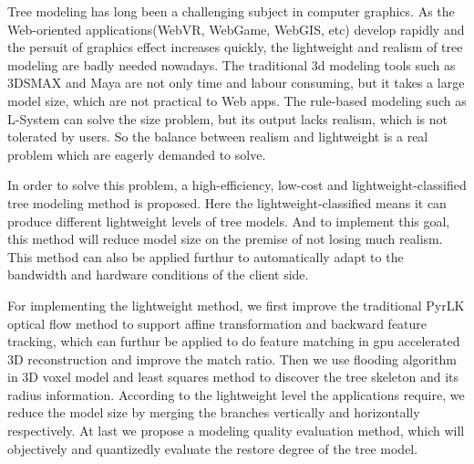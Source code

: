 
\begin{eabstract}
Tree modeling has long been a challenging subject in computer graphics. As the Web-oriented applications(WebVR, WebGame,
WebGIS, etc) develop rapidly and the persuit of graphics effect increases quickly, the lightweight and realism of tree modeling are badly
needed nowadays. The traditional 3d modeling tools such as 3DSMAX and Maya are not only time and labour consuming, but it
takes a large model size, which are not practical to Web apps. The rule-based modeling such as L-System can solve the size
problem, but its output lacks realism, which is not tolerated by users. So the balance between realism and lightweight
is a real problem which are eagerly demanded to solve.

In order to solve this problem, a high-efficiency, low-cost and lightweight-classified tree modeling method is proposed.
Here the lightweight-classified means it can produce different lightweight levels of tree models. And to implement this 
goal, this method will reduce model size on the premise of not losing much realism. This method can also be applied furthur
to automatically adapt to the bandwidth and hardware conditions of the client side.

For implementing the lightweight method, we first improve the traditional PyrLK optical flow method to support affine transformation
and backward feature tracking, which can furthur be applied to do feature matching in gpu accelerated 3D reconstruction and 
improve the match ratio. Then we use flooding algorithm in 3D voxel model and least squares method to discover the tree skeleton and
its radius information. According to the lightweight level the applications require, we reduce the model size by merging the
branches vertically and horizontally respectively. At last we propose a modeling quality evaluation method, which will objectively and 
quantizedly evaluate the restore degree of the tree model.
\end{eabstract}

